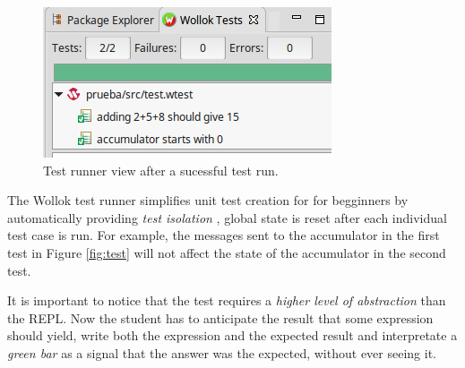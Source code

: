 \begin{figure}[ht]
\vspace{-2mm}
\centering
\includegraphics[scale=0.5]{images/testRunner.png}
\vspace{-3mm}
\caption{Test runner view after a sucessful test run.}
\label{fig:testRunner.png}
\vspace{-5mm}
\end{figure}

The Wollok test runner simplifies unit test creation for for begginners by automatically providing \emph{test isolation} \cite{martin2008cleanCode},
\ie global state is reset after each individual test case is run.
For example, the messages sent to the accumulator in the first test in Figure \ref{fig:test} will not affect the state of the accumulator in the second test.

It is important to notice that the test requires a \emph{higher level of abstraction} than the REPL.
Now the student has to anticipate the result that some expression should yield, write both the expression and the expected result 
and interpretate a \emph{green bar} as a signal that the answer was the expected, without ever seeing it.


